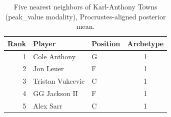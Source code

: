 \begin{table}[htbp]
  \centering\small
  \begin{tabular}{rllc}
    \toprule
    Rank & Player & Position & Archetype \\
    \midrule
    1 & Cole Anthony & G & 1 \\
    2 & Jon Leuer & F & 1 \\
    3 & Tristan Vukcevic & C & 1 \\
    4 & GG Jackson II & F & 1 \\
    5 & Alex Sarr & C & 1 \\
    \bottomrule
  \end{tabular}
  \caption{Five nearest neighbors of Karl-Anthony Towns (peak_value modality), Procrustes-aligned posterior mean.}
  \label{tab:Karl_Anthony_Towns_neighbors_peak_value}
\end{table}

